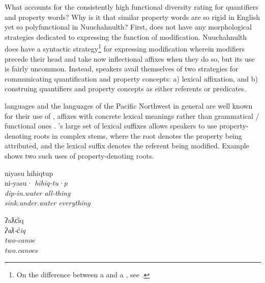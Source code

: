 What accounts for the consistently high functional diversity rating for quantifiers and property words? Why is it that similar property words are so rigid in English yet so polyfunctional in Nuuchahnulth? First,  does not have any morphological strategies dedicated to expressing the function of modification. Nuuchahnulth does have a syntactic strategy\footnote{On the difference between a  and a , see \textcites[537]{Croft2014}[380]{Croft2016}.} for expressing modification wherein modifiers precede their head and take now inflectional affixes when they do so, but its use is fairly uncommon. Instead, speakers avail themselves of two strategies for communicating quantification and property concepts: a) lexical affixation, and b) construing quantifiers and property concepts as either referents or predicates.

 languages and the languages of the Pacific Northwest in general are well known for their use of , affixes with concrete lexical meanings rather than grammatical / functional ones \parencite{Mithun1997}. 's large set of lexical suffixes allows speakers to use property-denoting roots in complex stems, where the root denotes the property being attributed, and the lexical suffix denotes the referent being modified. Example  shows two such uses of property-denoting roots.

\begin{exe}
  \ex\label{ex:4.1}
  \begin{xlist}

    \ex\label{ex:4.1a}
    \gllll niyasu           hihiqtup\\
           ni‑yasu·         \em{hihiq}‑tu·p\\
           dip‑in.water     \em{all}‑thing\\
           sink.under.water everything\\

    \ex\label{ex:4.1b}
    \gllll ʔaƛc̓iq\\
           \em{ʔaƛ}‑c̓iq\\
           \em{two}‑canoe\\
           two.canoes\\

  \end{xlist}
\end{exe}

